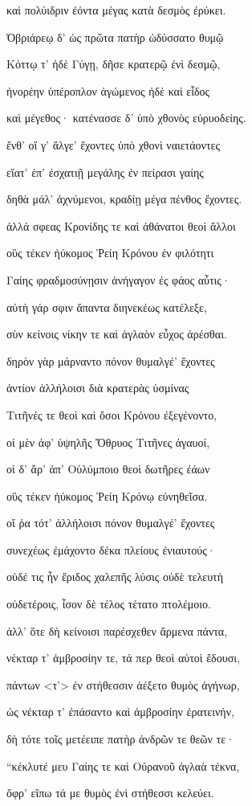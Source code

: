 \begin{pages}
\begin{Leftside}
καὶ πολύιδριν ἐόντα μέγας κατὰ δεσμὸς ἐρύκει.

Ὀβριάρεῳ δ' ὡς πρῶτα πατὴρ ὠδύσσατο θυμῷ 

Κόττῳ τ' ἠδὲ Γύγῃ, δῆσε κρατερῷ ἐνὶ δεσμῷ, 

ἠνορέην ὑπέροπλον ἀγώμενος ἠδὲ καὶ εἶδος

καὶ μέγεθος· κατένασσε δ' ὑπὸ χθονὸς εὐρυοδείης.  

ἔνθ' οἵ γ' ἄλγε' ἔχοντες ὑπὸ χθονὶ ναιετάοντες

εἵατ' ἐπ' ἐσχατιῇ μεγάλης ἐν πείρασι γαίης 

δηθὰ μάλ' ἀχνύμενοι, κραδίῃ μέγα πένθος ἔχοντες.

ἀλλά σφεας Κρονίδης τε καὶ ἀθάνατοι θεοὶ ἄλλοι 

οὓς τέκεν ἠύκομος Ῥείη Κρόνου ἐν φιλότητι  

Γαίης φραδμοσύνῃσιν ἀνήγαγον ἐς φάος αὖτις· 

αὐτὴ γάρ σφιν ἅπαντα διηνεκέως κατέλεξε, 

σὺν κείνοις νίκην τε καὶ ἀγλαὸν εὖχος ἀρέσθαι.

δηρὸν γὰρ μάρναντο πόνον θυμαλγέ' ἔχοντες

ἀντίον ἀλλήλοισι διὰ κρατερὰς ὑσμίνας    %

Τιτῆνές τε θεοὶ καὶ ὅσοι Κρόνου ἐξεγένοντο, 

οἱ μὲν ἀφ' ὑψηλῆς Ὄθρυος Τιτῆνες ἀγαυοί,  

οἱ δ' ἄρ' ἀπ' Οὐλύμποιο θεοὶ δωτῆρες ἐάων 

οὓς τέκεν ἠύκομος Ῥείη Κρόνῳ εὐνηθεῖσα.

οἵ ῥα τότ' ἀλλήλοισι πόνον θυμαλγέ' ἔχοντες  

συνεχέως ἐμάχοντο δέκα πλείους ἐνιαυτούς· 

οὐδέ τις ἦν ἔριδος χαλεπῆς λύσις οὐδὲ τελευτὴ

οὐδετέροις, ἶσον δὲ τέλος τέτατο πτολέμοιο.

ἀλλ' ὅτε δὴ κείνοισι παρέσχεθεν ἄρμενα πάντα,

νέκταρ τ' ἀμβροσίην τε, τά περ θεοὶ αὐτοὶ ἔδουσι, 

πάντων \textless{}τ'\textgreater{} ἐν στήθεσσιν ἀέξετο θυμὸς ἀγήνωρ,

ὡς νέκταρ τ' ἐπάσαντο καὶ ἀμβροσίην ἐρατεινήν,

δὴ τότε τοῖς μετέειπε πατὴρ ἀνδρῶν τε θεῶν τε·

``κέκλυτέ μευ Γαίης τε καὶ Οὐρανοῦ ἀγλαὰ τέκνα, 

ὄφρ' εἴπω τά με θυμὸς ἐνὶ στήθεσσι κελεύει.  


\end{Leftside}
\end{pages}

